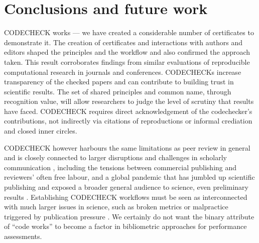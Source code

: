 \documentclass[12pt]{article}
\begin{document}
\section*{Conclusions and future work}\label{future-work-and-conclusions}

CODECHECK works --- we have created a considerable number of
certificates to demonstrate it.  The creation of certificates and
interactions with authors and editors shaped the principles and the
workflow and also confirmed the approach taken. This result
corroborates findings from similar evaluations of reproducible
computational research in journals and conferences.  CODECHECKs
increase transparency of the checked papers and can contribute to
building trust in scientific results.
The set of shared principles and common name, through recognition
value, will allow researchers to judge the level of scrutiny that
results have faced. CODECHECK requires direct acknowledgement of the
codechecker's contributions, not indirectly via citations of
reproductions or informal crediation and closed inner circles.

CODECHECK however harbours the same limitations as peer review in
general and is closely connected to larger disruptions and challenges
in scholarly communication
\cite{eglen_recent_2018,tennant_ten_2019,fyfe_mission_2019}, including
the tensions between commercial publishing and reviewers' often free
labour, and a global pandemic that has jumbled up scientific
publishing and exposed a broader general audience to science, even
preliminary results \cite{munafo_what_2020}.  Establishing CODECHECK
workflows must be seen as interconnected with much larger issues in
science, such as broken metrics or malpractice triggered by
publication pressure
\cite{piwowar_altmetrics:_2013,nosek_promoting_2015}.  We certainly do
not want the binary attribute of ``code works'' to become a factor in
bibliometric approaches for performance assessments.
\end{document}

